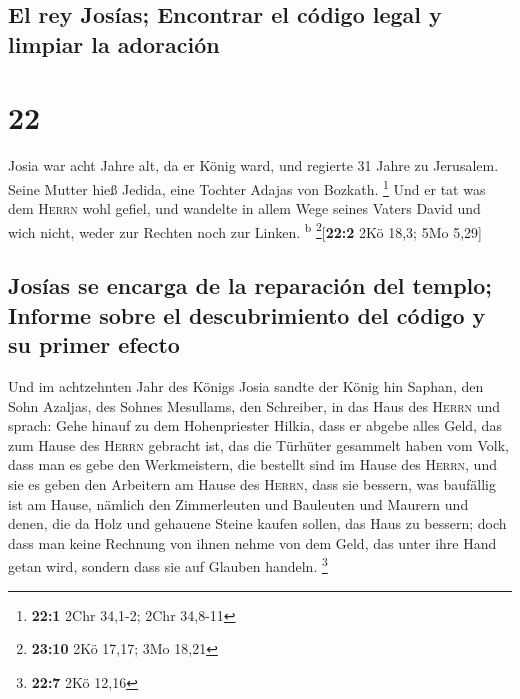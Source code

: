\hypertarget{el-rey-josuxedas-encontrar-el-cuxf3digo-legal-y-limpiar-la-adoraciuxf3n}{%
\subsection{El rey Josías; Encontrar el código legal y limpiar la
adoración}\label{el-rey-josuxedas-encontrar-el-cuxf3digo-legal-y-limpiar-la-adoraciuxf3n}}

\hypertarget{section-21}{%
\section{22}\label{section-21}}

 Josia war acht Jahre alt, da er König ward, und regierte
31 Jahre zu Jerusalem. Seine Mutter hieß Jedida, eine Tochter Adajas von
Bozkath. \footnote{\textbf{22:1} 2Chr 34,1-2; 2Chr 34,8-11}
 Und er tat was dem \textsc{Herrn} wohl gefiel, und
wandelte in allem Wege seines Vaters David und wich nicht, weder zur
Rechten noch zur Linken. \textsuperscript{b} \footnote{\textbf{23:10}
  2Kö 17,17; 3Mo 18,21}{[}\textbf{22:2} 2Kö 18,3; 5Mo 5,29{]}

\hypertarget{josuxedas-se-encarga-de-la-reparaciuxf3n-del-templo-informe-sobre-el-descubrimiento-del-cuxf3digo-y-su-primer-efecto}{%
\subsection{Josías se encarga de la reparación del templo; Informe sobre
el descubrimiento del código y su primer
efecto}\label{josuxedas-se-encarga-de-la-reparaciuxf3n-del-templo-informe-sobre-el-descubrimiento-del-cuxf3digo-y-su-primer-efecto}}

 Und im achtzehnten Jahr des Königs Josia sandte der König
hin Saphan, den Sohn Azaljas, des Sohnes Mesullams, den Schreiber, in
das Haus des \textsc{Herrn} und sprach:  Gehe hinauf zu
dem Hohenpriester Hilkia, dass er abgebe alles Geld, das zum Hause des
\textsc{Herrn} gebracht ist, das die Türhüter gesammelt haben vom Volk,
 dass man es gebe den Werkmeistern, die bestellt sind im
Hause des \textsc{Herrn}, und sie es geben den Arbeitern am Hause des
\textsc{Herrn}, dass sie bessern, was baufällig ist am Hause,
 nämlich den Zimmerleuten und Bauleuten und Maurern und
denen, die da Holz und gehauene Steine kaufen sollen, das Haus zu
bessern;  doch dass man keine Rechnung von ihnen nehme von
dem Geld, das unter ihre Hand getan wird, sondern dass sie auf Glauben
handeln. \footnote{\textbf{22:7} 2Kö 12,16}

